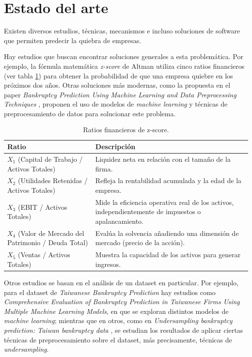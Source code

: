 
\section{Estado del arte}

Existen diversos estudios, técnicas, mecanismos e incluso soluciones de software que permiten predecir la quiebra de empresas.

Hay estudios que buscan encontrar soluciones generales a esta problemática. Por ejemplo, la fórmula matemática \textit{z-score} de Altman \citep{article:altman-z-score} utiliza cinco ratios financieros (ver tabla \ref{tab:z-score}) para obtener la probabilidad de que una empresa quiebre en los próximos dos años. Otras soluciones más modernas, como la propuesta en el paper \textit{Bankruptcy Prediction Using Machine Learning and Data Preprocessing Techniques} \citep{article:bankruptcy-prediction-ml-data-preprocessing}, proponen el uso de modelos de \textit{machine learning} y técnicas de preprocesamiento de datos para solucionar este problema.

\begin{table}[H]
	\centering
	\caption[Ratios financieros de z-score]{Ratios financieros de z-score.}
	\begin{tabularx}{\textwidth}{X X}
		\toprule
		\textbf{Ratio} 	 & \textbf{Descripción} \\
		\midrule
        \(X_{1}\) (Capital de Trabajo / Activos Totales) &  Liquidez neta en relación con el tamaño de la firma. \\
        \(X_{2}\) (Utilidades Retenidas / Activos Totales) & Refleja la rentabilidad acumulada y la edad de la empresa. \\
        \(X_{3}\) (EBIT / Activos Totales) & Mide la eficiencia operativa real de los activos, independientemente de impuestos o apalancamiento. \\
        \(X_{4}\) (Valor de Mercado del Patrimonio / Deuda Total) & Evalúa la solvencia añadiendo una dimensión de mercado (precio de la acción). \\
        \(X_{5}\) (Ventas / Activos Totales) & Muestra la capacidad de los activos para generar ingresos. \\
		\bottomrule
		\hline
	\end{tabularx}
	\label{tab:z-score}
\end{table}

Otros estudios se basan en el análisis de un dataset en particular. Por ejemplo, para el dataset de \textit{Taiwanese Bankruptcy Prediction} \citep{taiwanese_bankruptcy_prediction_572} hay estudios como \textit{Comprehensive Evaluation of Bankruptcy Prediction in Taiwanese Firms Using Multiple Machine Learning Models}, en que se exploran distintos modelos de \textit{machine learning}; mientras que en otros, como en \textit{Undersampling bankruptcy prediction: Taiwan bankruptcy data} \citep{10.1371/journal.pone.0254030}, se estudian los resultados de aplicar ciertas técnicas de preprocesamiento sobre el dataset, más precisamente, técnicas de \textit{undersampling}.


